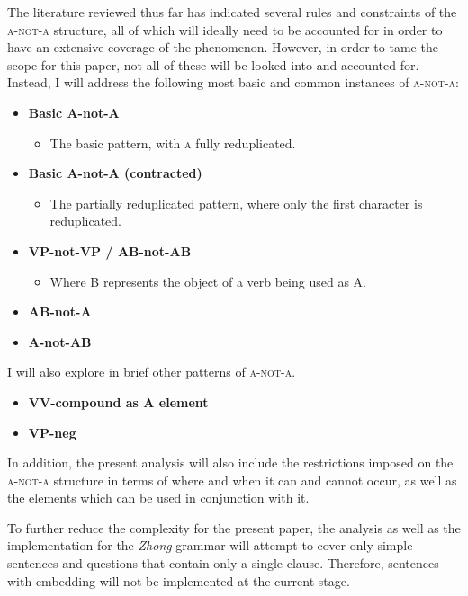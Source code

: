 \documentclass[12pt, UTF8]{article}
\begin{document}
The literature reviewed thus far has indicated several rules and constraints of the \textsc{a-not-a} structure, all of which will ideally need to be accounted for in order to have an extensive coverage of the phenomenon. However, in order to tame the scope for this paper, not all of these will be looked into and accounted for. Instead, I will address the following most basic and common instances of \textsc{a-not-a}:
\begin{itemize}
\item \textbf{Basic A-not-A}
	\begin{itemize}
	\item The basic pattern, with \textsc{a} fully reduplicated.
	\end{itemize}
\item \textbf{Basic A-not-A (contracted)}
	\begin{itemize}
		\item The partially reduplicated pattern, where only the first character is reduplicated.
	\end{itemize}
\item \textbf{VP-not-VP / AB-not-AB}
	\begin{itemize}
		\item Where B represents the object of a verb being used as A.
		\end{itemize}
\item \textbf{AB-not-A}
\item \textbf{A-not-AB}

\end{itemize}

I will also explore in brief other patterns of \textsc{a-not-a}. 

\begin{itemize}
\item \textbf{VV-compound as A element}
\item \textbf{VP-neg}
\end{itemize}

In addition, the present analysis will also include the restrictions imposed on the \textsc{a-not-a} structure in terms of where and when it can and cannot occur, as well as the elements which can be used in conjunction with it.

To further reduce the complexity for the present paper, the analysis as well as the implementation for the \textit{Zhong} grammar will attempt to cover only simple sentences and questions that contain only a single clause. Therefore, sentences with embedding will not be implemented at the current stage.
\end{document}
